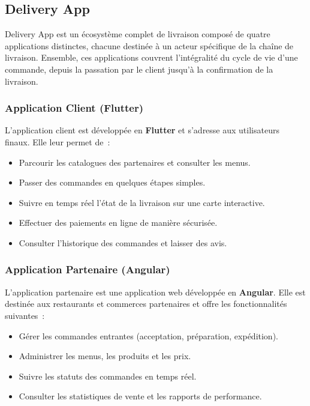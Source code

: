 \subsection{Delivery App}
\label{subsec:delivery-app}

Delivery App est un écosystème complet de livraison composé de quatre applications distinctes, chacune destinée à un acteur spécifique de la chaîne de livraison. Ensemble, ces applications couvrent l'intégralité du cycle de vie d'une commande, depuis la passation par le client jusqu'à la confirmation de la livraison.

\subsubsection{Application Client (Flutter)}
\label{subsubsec:app-client}

L'application client est développée en \textbf{Flutter} et s'adresse aux utilisateurs finaux. Elle leur permet de~:

\begin{itemize}
    \item Parcourir les catalogues des partenaires et consulter les menus.
    \item Passer des commandes en quelques étapes simples.
    \item Suivre en temps réel l'état de la livraison sur une carte interactive.
    \item Effectuer des paiements en ligne de manière sécurisée.
    \item Consulter l'historique des commandes et laisser des avis.
\end{itemize}

\subsubsection{Application Partenaire (Angular)}
\label{subsubsec:app-partenaire}

L'application partenaire est une application web développée en \textbf{Angular}. Elle est destinée aux restaurants et commerces partenaires et offre les fonctionnalités suivantes~:

\begin{itemize}
    \item Gérer les commandes entrantes (acceptation, préparation, expédition).
    \item Administrer les menus, les produits et les prix.
    \item Suivre les statuts des commandes en temps réel.
    \item Consulter les statistiques de vente et les rapports de performance.
\end{itemize}

